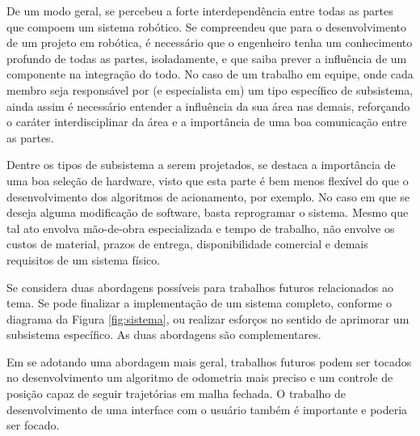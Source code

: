 
De um modo geral, se percebeu a forte interdependência entre todas as partes que compoem um sistema robótico. Se compreendeu que para o desenvolvimento de um projeto em robótica, é necessário que o engenheiro tenha um conhecimento profundo de todas as partes, isoladamente, e que saiba prever a influência de um componente na integração do todo. No caso de um trabalho em equipe, onde cada membro seja responsável por (e especialista em) um tipo específico de subsistema, ainda assim é necessário entender a influência da sua área nas demais, reforçando o caráter interdisciplinar da área e a importância de uma boa comunicação entre as partes.

Dentre os tipos de subsistema a serem projetados, se destaca a importância de uma boa seleção de hardware, visto que esta parte é bem menos flexível do que o desenvolvimento dos algoritmos de acionamento, por exemplo. No caso em que se deseja alguma modificação de software, basta reprogramar o sistema. Mesmo que tal ato envolva mão-de-obra especializada e tempo de trabalho, não envolve os custos de material, prazos de entrega, disponibilidade comercial e demais requisitos de um sistema físico.


Se considera duas abordagens possíveis para trabalhos futuros relacionados ao tema. Se pode finalizar a implementação de um sistema completo, conforme o diagrama da Figura \ref{fig:sistema}, ou realizar esforços no sentido de aprimorar um subsistema específico. As duas abordagens são complementares.

Em se adotando uma abordagem mais geral, trabalhos futuros podem ser tocados no desenvolvimento um algoritmo de odometria mais preciso e um controle de posição capaz de seguir trajetórias em malha fechada. O trabalho de desenvolvimento de uma interface com o usuário também é importante e poderia ser focado.

